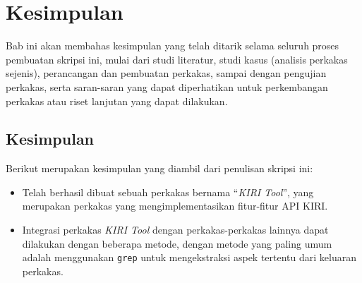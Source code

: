 \chapter{Kesimpulan}
\label{chap:conclusion}

Bab ini akan membahas kesimpulan yang telah ditarik selama seluruh proses pembuatan skripsi ini, mulai dari studi literatur, studi kasus (analisis perkakas sejenis), perancangan dan pembuatan perkakas, sampai dengan pengujian perkakas, serta saran-saran yang dapat diperhatikan untuk perkembangan perkakas atau riset lanjutan yang dapat dilakukan.

\section{Kesimpulan}
\label{chap:conclusion-endnotes}

Berikut merupakan kesimpulan yang diambil dari penulisan skripsi ini:

\begin{itemize}
	\item Telah berhasil dibuat sebuah perkakas bernama ``\textit{KIRI Tool}'', yang merupakan perkakas \cl yang mengimplementasikan fitur-fitur API KIRI.
	\item Integrasi perkakas \textit{KIRI Tool} dengan perkakas-perkakas \cl lainnya dapat dilakukan dengan beberapa metode, dengan metode yang paling umum adalah menggunakan \verb|grep| untuk mengekstraksi aspek tertentu dari keluaran perkakas.
	\begin{comment}
	\item Perangkat-perangkat lunak berbasis \cl pada umumnya memiliki aturan-aturan standar yang harus diikuti, seperti memiliki tampilan murni dalam CLI (hanya teks), dioperasikan dengan perintah-perintah (yang juga berupa teks), dan memiliki halaman bantuan (entah berupa \textit{manual page} atau mode operasional simpel yang menampilkan cara penggunaan perkakas, seperti \verb|--help|).
	\item Perangkat-perangkat lunak berbasis \cl lebih sulit untuk dipelajari cara penggunaannya, tetapi pada umumnya lebih fleksibel dalam aspek-aspek fungsionalitasnya, dalam arti bahwa fitur-fitur yang ada tidak terikat pada satu fungsi yang pasti.
	\item KIRI merupakan sebuah aplikasi berbasis web yang dapat menunjukkan rute untuk pergi dari satu lokasi ke lokasi lain menggunakan angkutan kota. Dengan dibuatnya perkakas ini, KIRI akan dapat digunakan tanpa perlu membuka peramban web.
	\item Versi \cl dari perkakas-perkakas berbasis GUI yang ada dapat dianggap sebagai versi lebih ringan dari perkakas-perkakas tersebut, serta lebih cepat untuk digunakan.
	\end{comment}
\end{itemize}


